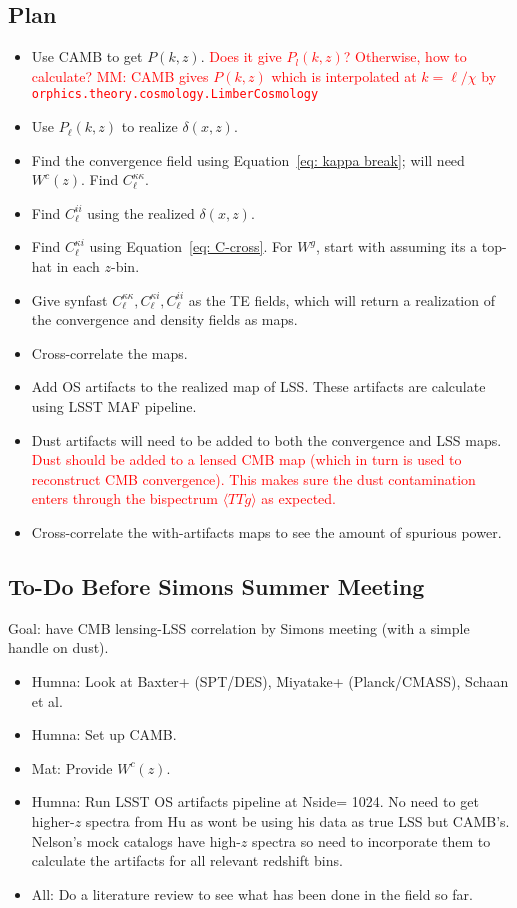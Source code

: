 \documentclass{article}
\newcommand{\clred}[1]{\textcolor{red}{#1}}
\begin{document}
{\subsection*{Plan}
\begin{itemize}
\item Use CAMB to get $P(k,z)$. \clred{Does it give $P_l(k,z)$? Otherwise, how to calculate? MM: CAMB gives $P(k,z)$ which is interpolated at $k=\ell/\chi$ by \texttt{orphics.theory.cosmology.LimberCosmology}}
\item Use  $P_\ell(k,z)$ to realize $\delta(x, z)$. 
\item Find the convergence field using Equation~\ref{eq: kappa break}; will need $W^c(z)$. Find $C_\ell^{\kappa\kappa}$.
\item Find $C_\ell^{ii}$ using the realized $\delta(x,z)$.
\item Find $C_\ell^{\kappa i}$ using Equation~\ref{eq: C-cross}. For $W^g$, start with assuming its a top-hat in each $z$-bin.
\item Give synfast $C_\ell^{\kappa\kappa}, C_\ell^{\kappa i}, C_\ell^{ii}$ as the TE fields, which will return a realization of the convergence and density fields as maps.
\item Cross-correlate the maps.
\item Add OS artifacts to the realized map of LSS. These artifacts are calculate using LSST MAF pipeline.
\item Dust artifacts will need to be added to both the convergence and LSS maps. \clred{Dust should be added to a lensed CMB map (which in turn is used to reconstruct CMB convergence). This makes sure the dust contamination enters through the bispectrum $\langle TTg \rangle$ as expected.}
\item Cross-correlate the with-artifacts maps to see the amount of spurious power.
\end{itemize}

\subsection*{To-Do Before Simons Summer Meeting}
Goal: have CMB lensing-LSS correlation by Simons meeting (with a simple handle on dust).
\begin{itemize}
\item Humna: Look at Baxter+ (SPT/DES), Miyatake+ (Planck/CMASS), Schaan et al.
\item Humna: Set up CAMB.
\item Mat: Provide $W^c(z)$.
\item Humna: Run LSST OS artifacts pipeline at Nside= 1024. No need to get higher-$z$ spectra from Hu as wont be using his data as true LSS but CAMB's. Nelson's mock catalogs have high-$z$ spectra so need to incorporate them to calculate the artifacts for all relevant redshift bins.
\item All: Do a literature review to see what has been done in the field so far.
\end{itemize}









}
\end{document}
